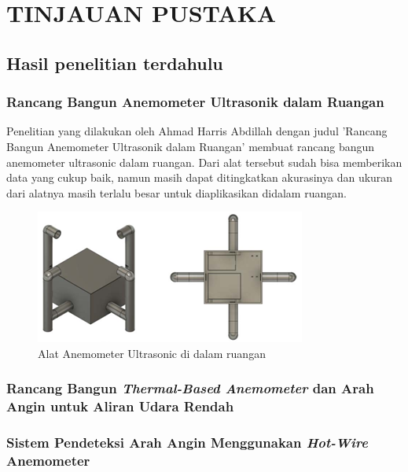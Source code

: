 \section{TINJAUAN PUSTAKA}

\subsection{Hasil penelitian terdahulu}
\subsubsection{Rancang Bangun Anemometer Ultrasonik dalam Ruangan}
Penelitian yang dilakukan oleh Ahmad Harris Abdillah dengan judul 'Rancang Bangun Anemometer Ultrasonik dalam Ruangan' \parencite{Newton1687} 
membuat rancang bangun anemometer ultrasonic dalam ruangan. Dari alat tersebut sudah bisa memberikan data yang cukup baik, namun masih dapat 
ditingkatkan akurasinya dan ukuran dari alatnya masih terlalu besar untuk diaplikasikan didalam ruangan.

\begin{figure}[h!]
	\label{abdillah_anemo_skema}
	\includegraphics[width=\linewidth]{gambar/fig_anemometer_abdillah_skema}
	\caption{Alat Anemometer Ultrasonic di dalam ruangan \parencite{Abdillah2022}}
\end{figure}

\subsubsection{Rancang Bangun \emph{Thermal-Based Anemometer} dan Arah Angin untuk Aliran Udara Rendah}

\subsubsection{Sistem Pendeteksi Arah Angin Menggunakan \textit{Hot-Wire} Anemometer}

